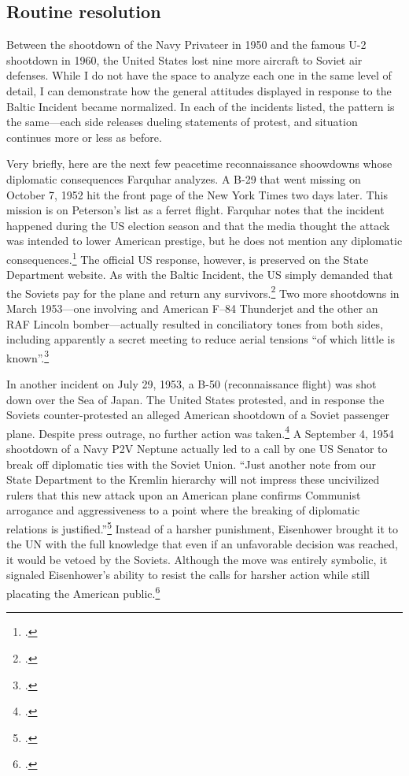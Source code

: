 \documentclass{report}
\begin{document}
\begin{refsegment}
\subsection{Routine resolution}
Between the shootdown of the Navy Privateer in 1950 and the famous U-2 shootdown in 1960, the United States lost nine more aircraft to Soviet air defenses. While I do not have the space to analyze each one in the same level of detail, I can demonstrate how the general attitudes displayed in response to the Baltic Incident became normalized. In each of the incidents listed, the pattern is the same---each side releases dueling statements of protest, and situation continues more or less as before.

Very briefly, here are the next few peacetime reconnaissance shoowdowns whose diplomatic consequences Farquhar analyzes. A B-29 that went missing on October 7, 1952 hit the front page of the New York Times two days later. This mission is on Peterson's list as a ferret flight. Farquhar notes that the incident happened during the US election season and that the media thought the attack was intended to lower American prestige, but he does not mention any diplomatic consequences.\footcite[p.~43-44]{farquhar_aerial_2015} The official US response, however, is preserved on the State Department website. As with the Baltic Incident, the US simply demanded that the Soviets pay for the plane and return any survivors.\footcite{the_new_york_times_u.s._1952} Two more shootdowns in March 1953---one involving and American F–84 Thunderjet and the other an RAF Lincoln bomber---actually resulted in conciliatory tones from both sides, including apparently a secret meeting to reduce aerial tensions ``of which little is known''.\footcite[p.~45]{farquhar_aerial_2015}

In another incident on July 29, 1953, a B-50 (reconnaissance flight) was shot down over the Sea of Japan. The United States protested, and in response the Soviets counter-protested an alleged American shootdown of a Soviet passenger plane. Despite press outrage, no further action was taken.\footcite[p.~47]{farquhar_aerial_2015} A September 4, 1954 shootdown of a Navy P2V Neptune actually led to a call by one US Senator to break off diplomatic ties with the Soviet Union. ``Just another note from our State Department to the Kremlin hierarchy will not impress these uncivilized rulers \textelp{} that this new attack upon an American plane confirms Communist arrogance and aggressiveness to a point where the breaking of diplomatic relations is justified.''\footcite{the_associated_press_ending_1954} Instead of a harsher punishment, Eisenhower brought it to the UN with the full knowledge that even if an unfavorable decision was reached, it would be vetoed by the Soviets. Although the move was entirely symbolic, it signaled Eisenhower's ability to resist the calls for harsher action while still placating the American public.\footcite[p.~47]{farquhar_aerial_2015}


\end{refsegment}
\end{document}
